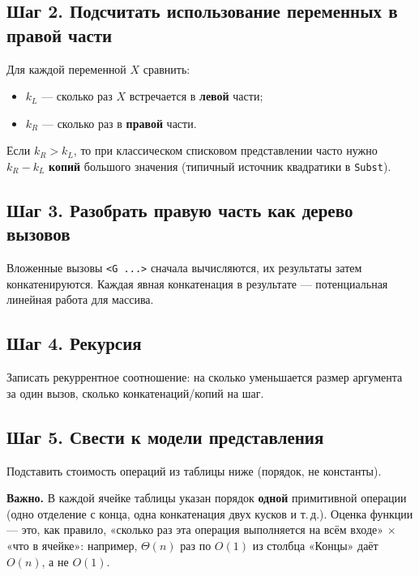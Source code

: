 \documentclass[12pt,a4paper]{article}
\newcommand{\bigO}{\ensuremath{O}}
\begin{document}
\subsection{Шаг 2. Подсчитать использование переменных в правой части}

Для каждой переменной \(X\) сравнить:
\begin{itemize}
  \item \(k_L\) --- сколько раз \(X\) встречается в \textbf{левой} части;
  \item \(k_R\) --- сколько раз в \textbf{правой} части.
\end{itemize}

Если \(k_R > k_L\), то при классическом списковом представлении часто нужно \(k_R - k_L\) \textbf{копий} большого значения (типичный источник квадратики в \texttt{Subst}).

\subsection{Шаг 3. Разобрать правую часть как дерево вызовов}

Вложенные вызовы \texttt{<G ...>} сначала вычисляются, их результаты затем конкатенируются. Каждая явная конкатенация в результате --- потенциальная линейная работа для массива.

\subsection{Шаг 4. Рекурсия}

Записать рекуррентное соотношение: на сколько уменьшается размер аргумента за один вызов, сколько конкатенаций/копий на шаг.

\subsection{Шаг 5. Свести к модели представления}

Подставить стоимость операций из таблицы ниже (порядок, не константы).

\textbf{Важно.} В каждой ячейке таблицы указан порядок \textbf{одной} примитивной операции (одно отделение с конца, одна конкатенация двух кусков и т.\,д.). Оценка функции --- это, как правило, «сколько раз эта операция выполняется на всём входе» \(\times\) «что в ячейке»: например, \(\Theta(n)\) раз по \(O(1)\) из столбца «Концы» даёт \(\bigO(n)\), а не \(O(1)\).
\end{document}
